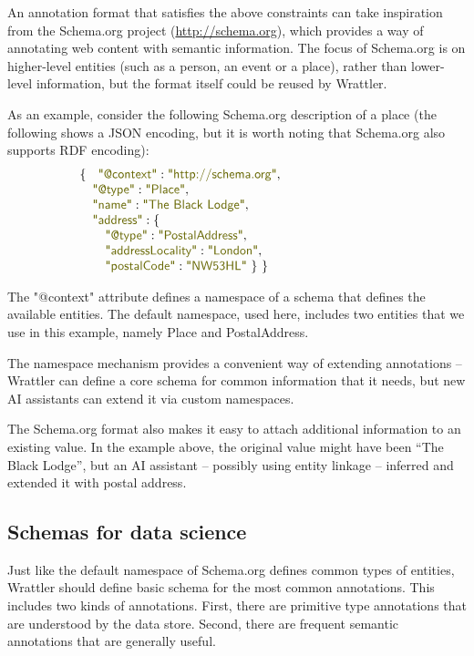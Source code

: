 \documentclass[sigplan,preprint,10pt]{acmart}\settopmatter{printfolios=true,printccs=false,printacmref=false}
\theoremstyle{plain}
\theoremstyle{definition}
\newcommand{\str}[1]{\textnormal{\textcolor{strclr}{\sffamily "#1"}}}
\begin{document}
{An annotation format that satisfies the above constraints can take inspiration from the 
Schema.org project (\url{http://schema.org}), which provides a way of annotating web content
with semantic information. The focus of Schema.org is on higher-level entities (such as 
a person, an event or a place), rather than lower-level information, but the format itself could
be reused by Wrattler.

As an example, consider the following Schema.org description of a place (the following shows a
JSON encoding, but it is worth noting that Schema.org also supports RDF encoding):
%
\begin{equation*}
\begin{array}{l}
\{~~\; \str{@context}: \str{http://schema.org},\\
\quad  \str{@type}: \str{Place},\\
\quad  \str{name}: \str{The Black Lodge},\\
\quad  \str{address}: \{\\
\qquad    \str{@type}: \str{PostalAddress},\\
\qquad    \str{addressLocality}: \str{London},\qquad\qquad\qquad\qquad\qquad~\\
\qquad    \str{postalCode}: \str{NW53HL} ~\}~\}\\
\end{array}
\end{equation*}

\noindent
The \str{@context} attribute defines a namespace of a schema that defines the available
entities. The default namespace, used here, includes two entities that we use in this 
example, namely Place and PostalAddress.

The namespace mechanism provides a convenient way of extending annotations -- Wrattler can
define a core schema for common information that it needs, but new AI assistants can 
extend it via custom namespaces.

The Schema.org format also makes it easy to attach additional information to an existing
value. In the example above, the original value might have been ``The Black Lodge'', but 
an AI assistant -- possibly using entity linkage -- inferred and extended it with postal address.

\subsection{Schemas for data science}
\label{sec:datastore-schema}

Just like the default namespace of Schema.org defines common types of entities, Wrattler
should define basic schema for the most common annotations. This includes two kinds of annotations.
First, there are primitive type annotations that are understood by the data store. Second,
there are frequent semantic annotations that are generally useful. 

}
\end{document}
